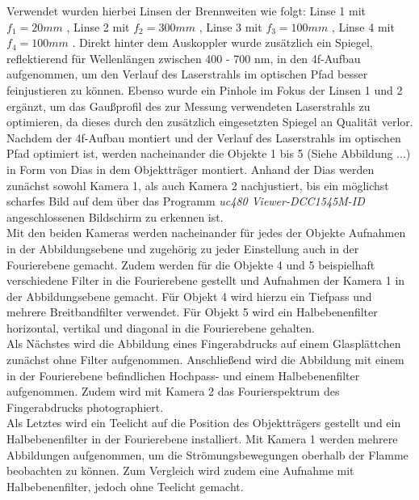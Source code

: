 Verwendet wurden hierbei Linsen der Brennweiten wie folgt: Linse 1 mit $f_{1}=20mm$ , Linse 2 mit $f_{2}=300mm$ , Linse 3 mit $f_{3}=100mm$ , Linse 4 mit $f_{4}=100mm$ .
Direkt hinter dem Auskoppler wurde zusätzlich ein Spiegel, reflektierend für Wellenlängen zwischen 400 - 700 nm, in den 4f-Aufbau aufgenommen, um den Verlauf des Laserstrahls im optischen Pfad besser feinjustieren zu können. Ebenso wurde ein Pinhole im Fokus der Linsen 1 und 2 ergänzt, um das Gaußprofil des zur Messung verwendeten Laserstrahls zu optimieren, da dieses durch den zusätzlich eingesetzten Spiegel an Qualität verlor. \\

Nachdem der 4f-Aufbau montiert und der Verlauf des Laserstrahls im optischen Pfad optimiert ist, werden nacheinander die Objekte 1 bis 5 (Siehe Abbildung ...) in Form von Dias in dem Objektträger montiert. Anhand der Dias werden zunächst sowohl Kamera 1, als auch Kamera 2 nachjustiert, bis ein möglichst scharfes Bild auf dem über das Programm \textit{uc480 Viewer-DCC1545M-ID} angeschlossenen Bildschirm zu erkennen ist.  \\
Mit den beiden Kameras werden nacheinander für jedes der Objekte Aufnahmen in der Abbildungsebene und zugehörig zu jeder Einstellung auch in der Fourierebene gemacht. Zudem werden für die Objekte 4 und 5 beispielhaft verschiedene Filter in die Fourierebene gestellt und Aufnahmen der Kamera 1 in der Abbildungsebene gemacht. Für Objekt 4 wird hierzu ein Tiefpass und mehrere Breitbandfilter verwendet. Für Objekt 5 wird ein Halbebenenfilter horizontal, vertikal und diagonal in die Fourierebene gehalten. \\

Als Nächstes wird die Abbildung eines Fingerabdrucks auf einem Glasplättchen zunächst ohne Filter aufgenommen. Anschließend wird die Abbildung mit einem in der Fourierebene befindlichen Hochpass- und einem Halbebenenfilter aufgenommen. Zudem wird mit Kamera 2 das Fourierspektrum des Fingerabdrucks photographiert. \\

Als Letztes wird ein Teelicht auf die Position des Objektträgers gestellt und ein Halbebenenfilter in der Fourierebene installiert. Mit Kamera 1 werden mehrere Abbildungen aufgenommen, um die Strömungsbewegungen oberhalb der Flamme beobachten zu können. 
Zum Vergleich wird zudem eine Aufnahme mit Halbebenenfilter, jedoch ohne Teelicht gemacht. 





